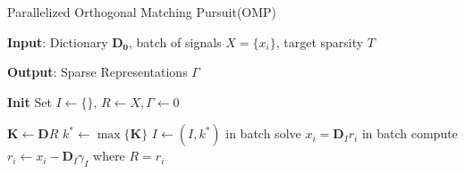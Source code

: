 \documentclass{article}
\begin{document}
\begin{algorithm}[H]
	\caption{Parallelized Orthogonal Matching Pursuit(OMP)} 
	\label{alg3}
	\begin{algorithmic}
		\STATE \textbf{Input}: Dictionary \(\mathbf{D_0}\), batch of signals \(X = \{x_i\}\), target sparsity \(T\)   
		
		\STATE \textbf{Output}: Sparse Representations \(\Gamma\) 
		
		\STATE \textbf{Init} Set \(I\leftarrow\{\},\,R\leftarrow X,\Gamma\leftarrow0\)
		
		\STATE \(\mathbf{K}\leftarrow \mathbf{D}R \)
		\STATE \(k^* \leftarrow \max{\{\mathbf{K}\}}\)
		\STATE \(I \leftarrow (I,k^*)\)
		\STATE in batch solve \(x_i = \mathbf{D}_Ir_i\)
		\STATE in batch compute \(r_i\leftarrow x_i - \mathbf{D}_I\gamma_I\) where \(R = {r_i}\)
		\ENDFOR
	\end{algorithmic}
\end{algorithm}
\end{document}
